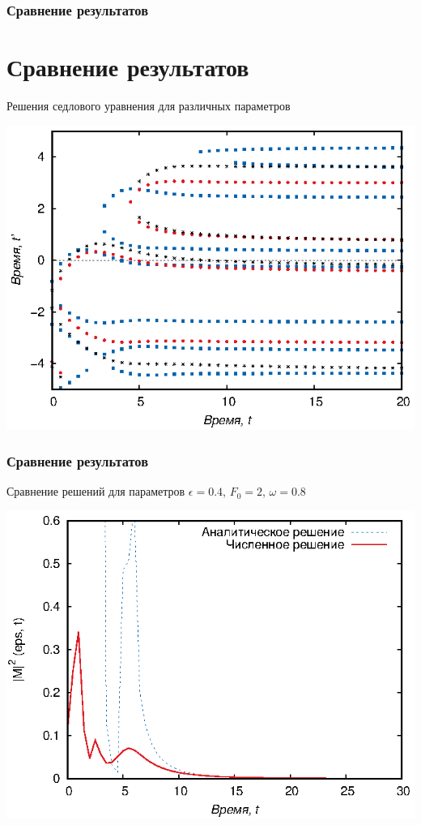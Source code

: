 \documentclass{beamer}
\begin{document}
\frame
{
	\frametitle{Сравнение результатов}
	\section{Сравнение результатов}
	Решения седлового уравнения для различных параметров
	
	\begin{center}
		\includegraphics{roots2}  
	\end{center}	
}

\frame
{
	\frametitle{Сравнение результатов}
	Сравнение решений для параметров $\epsilon = 0.4$, $F_0 = 2$, $\omega = 0.8$
	
	\begin{center}
		\includegraphics{full1}  
	\end{center}	
}
\end{document}
